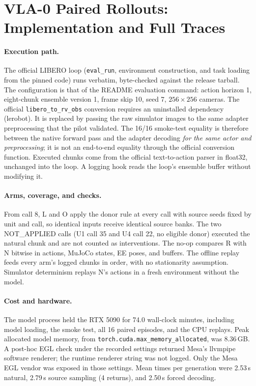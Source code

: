 \section{VLA-0 Paired Rollouts: Implementation and Full Traces}
\label{sec:vla0cl}
\paragraph{Execution path.} The official LIBERO loop (\texttt{eval\_run}, environment construction, and task loading from the pinned code) runs verbatim, byte-checked against the release tarball. The configuration is that of the README evaluation command: action horizon 1, eight-chunk ensemble version 1, frame skip 10, seed 7, $256\times256$ cameras. The official \texttt{libero\_to\_rv\_obs} conversion requires an uninstalled dependency (lerobot). It is replaced by passing the raw simulator images to the same adapter preprocessing that the pilot validated. The 16/16 smoke-test equality is therefore between the native forward pass and the adapter decoding \emph{for the same actor and preprocessing}; it is not an end-to-end equality through the official conversion function. Executed chunks come from the official text-to-action parser in float32, unchanged into the loop. A logging hook reads the loop's ensemble buffer without modifying it.

\paragraph{Arms, coverage, and checks.} From call 8, L and O apply the donor rule at every call with source seeds fixed by unit and call, so identical inputs receive identical source banks. The two NOT\_APPLIED calls (U1 call 35 and U4 call 22, no eligible donor) executed the natural chunk and are not counted as interventions. The no-op compares R with N bitwise in actions, MuJoCo states, EE poses, and buffers. The offline replay feeds every arm's logged chunks in order, with no stationarity assumption. Simulator determinism replays N's actions in a fresh environment without the model.

\paragraph{Cost and hardware.} The model process held the RTX 5090 for 74.0 wall-clock minutes, including model loading, the smoke test, all 16 paired episodes, and the CPU replays. Peak allocated model memory, from \texttt{torch.cuda.max\_memory\_allocated}, was 8.36\,GB. A post-hoc EGL check under the recorded settings returned Mesa's llvmpipe software renderer; the runtime renderer string was not logged. Only the Mesa EGL vendor was exposed in those settings. Mean times per generation were 2.53\,s natural, 2.79\,s source sampling (4 returns), and 2.50\,s forced decoding.

